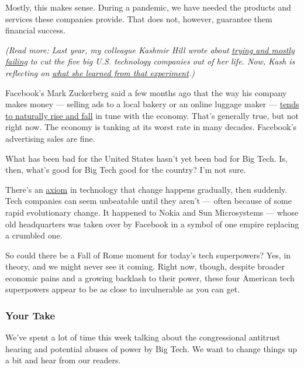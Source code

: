 Mostly, this makes sense. During a pandemic, we have needed the products
and services these companies provide. That does not, however, guarantee
them financial success.

\emph{(Read more: Last year, my colleague Kashmir Hill wrote about}
\href{https://gizmodo.com/c/goodbye-big-five}{\emph{trying and mostly
failing}} \emph{to cut the five big U.S. technology companies out of her
life. Now, Kash is reflecting on}
\href{https://www.nytimes.com/2020/07/31/technology/blocking-the-tech-giants.html}{\emph{what
she learned from that experiment}}\emph{.)}

Facebook's Mark Zuckerberg said a few months ago that the way his
company makes money --- selling ads to a local bakery or an online
luggage maker ---
\href{https://www.nytimes.com/2020/05/01/technology/coronavirus-big-tech-earnings.html}{tends
to naturally rise and fall} in tune with the economy. That's generally
true, but not right now. The economy is tanking at its worst rate in
many decades. Facebook's advertising sales are fine.

What has been bad for the United States hasn't yet been bad for Big
Tech. Is, then, what's good for Big Tech good for the country? I'm not
sure.

There's an
\href{https://www.oreilly.com/radar/gradually-then-suddenly/\#:~:text=There's\%20a\%20passage\%20in\%20Ernest,happens\%20much\%20the\%20same\%20way.}{axiom}
in technology that change happens gradually, then suddenly. Tech
companies can seem unbeatable until they aren't --- often because of
some rapid evolutionary change. It happened to Nokia and Sun
Microsystems --- whose old headquarters was taken over by Facebook in a
symbol of one empire replacing a crumbled one.

So could there be a Fall of Rome moment for today's tech superpowers?
Yes, in theory, and we might never see it coming. Right now, though,
despite broader economic pains and a growing backlash to their power,
these four American tech superpowers appear to be as close to
invulnerable as you can get.

\hypertarget{your-take}{%
\subsubsection{Your Take}\label{your-take}}

We've spent a lot of time this week talking about the congressional
antitrust hearing and potential abuses of power by Big Tech. We want to
change things up a bit and hear from our readers.

